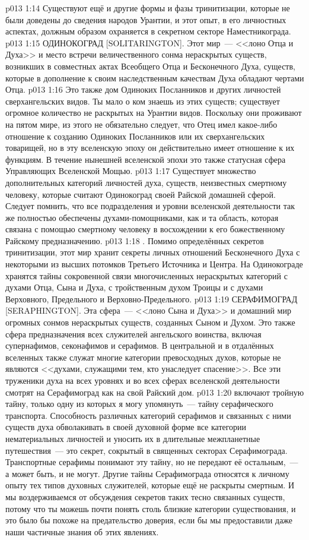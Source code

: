 \vs p013 1:14 Существуют ещё и другие формы и фазы тринитизации, которые не были доведены до сведения народов Урантии, и этот опыт, в его личностных аспектах, должным образом охраняется в секретном секторе Наместникограда.
\vs p013 1:15 ОДИНОКОГРАД [SOLITARINGTON]. Этот мир~--- <<лоно Отца и Духа>> и место встречи величественного сонма нераскрытых существ, возникших в совместных актах Всеобщего Отца и Бесконечного Духа, существ, которые в дополнение к своим наследственным качествам Духа обладают чертами Отца.
\vs p013 1:16 Это также дом Одиноких Посланников и других личностей сверхангельских видов. Ты мало о ком знаешь из этих существ; существует огромное количество не раскрытых на Урантии видов. Поскольку они проживают на пятом мире, из этого не обязательно следует, что Отец имел какое\hyp{}либо отношение к созданию Одиноких Посланников или их сверхангельских товарищей, но в эту вселенскую эпоху он действительно имеет отношение к их функциям. В течение нынешней вселенской эпохи это также статусная сфера Управляющих Вселенской Мощью.
\vs p013 1:17 Существует множество дополнительных категорий личностей духа, существ, неизвестных смертному человеку, которые считают Одинокоград своей Райской домашней сферой. Следует помнить, что все подразделения и уровни вселенской деятельности так же полностью обеспечены духами\hyp{}помощниками, как и та область, которая связана с помощью смертному человеку в восхождении к его божественному Райскому предназначению.
\vs p013 1:18 \pc {}. Помимо определённых секретов тринитизации, этот мир хранит секреты личных отношений Бесконечного Духа с некоторыми из высших потомков Третьего Источника и Центра. На Одинокограде хранятся тайны сокровенной связи многочисленных нераскрытых категорий с духами Отца, Сына и Духа, с тройственным духом Троицы и с духами Верховного, Предельного и Верховно\hyp{}Предельного.
\vs p013 1:19 СЕРАФИМОГРАД [SERAPHINGTON]. Эта сфера~--- <<лоно Сына и Духа>> и домашний мир огромных сонмов нераскрытых существ, созданных Сыном и Духом. Это также сфера предназначения всех служителей ангельского воинства, включая супернафимов, секонафимов и серафимов. В центральной и в отдалённых вселенных также служат многие категории превосходных духов, которые не являются <<духами, служащими тем, кто унаследует спасение>>. Все эти труженики духа на всех уровнях и во всех сферах вселенской деятельности смотрят на Серафимоград как на свой Райский дом.
\vs p013 1:20 \pc {} включают тройную тайну, только одну из которых я могу упомянуть~--- тайну серафического транспорта. Способность различных категорий серафимов и связанных с ними существ духа обволакивать в своей духовной форме все категории нематериальных личностей и уносить их в длительные межпланетные путешествия~--- это секрет, сокрытый в священных секторах Серафимограда. Транспортные серафимы понимают эту тайну, но не передают её остальным,~--- а может быть, и не могут. Другие тайны Серафимограда относятся к личному опыту тех типов духовных служителей, которые ещё не раскрыты смертным. И мы воздерживаемся от обсуждения секретов таких тесно связанных существ, потому что ты можешь почти понять столь близкие категории существования, и это было бы похоже на предательство доверия, если бы мы предоставили даже наши частичные знания об этих явлениях.
